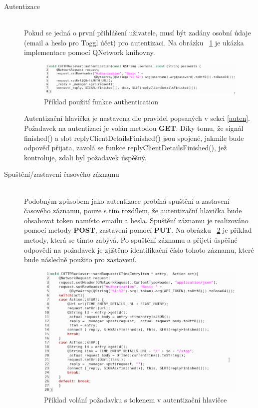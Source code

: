 \documentclass[thesis=B,czech]{FITthesis}[2012/06/26]
\begin{document}
\begin{description}
	\item[Autentizace]\hspace*{\fill} \\
	Pokud se jedná o první přihlášení uživatele, musí být zadány osobní údaje (email a heslo pro Toggl účet) pro autentizaci. Na obrázku ~\ref{fig:auth_code} je ukázka implementace pomocí QNetwork knihovny. 

 \begin{figure}[h]\centering
 	\includegraphics[width=1\textwidth]{auth_code.png}
 	\caption[Příklad použití finkci authentication]{Příklad použití funkce authentication}\label{fig:auth_code}
 \end{figure}
	 Autentizační hlavička je nastavena dle pravidel popsaných v sekci \ref{auten}. Požadavek na autentizaci je volán metodou \textbf{GET}. Díky tomu, že signál finished() a slot replyClientDetailsFinished() jsou spojené, jakmile bude odpověď přijata, zavolá se funkce replyClientDetailsFinished(), jež kontroluje, zdali byl požadavek úspěšný.
\item[Spuštění/zastavení časového záznamu ]\hspace*{\fill} \\
	Podobným způsobem jako autentizace probíhá spuštění a zastavení časového záznamu, pouze s tím rozdílem, že autentizační hlavička bude obsahovat token namísto emailu a hesla. Spuštění záznamu je realizováno pomocí metody \textbf{POST}, zastavení pomocí \textbf{PUT}. Na obrázku ~\ref{fig:start_stop_code} je příklad metody, která se tímto zabývá. Po spuštění záznamu a přijetí úspěšné odpovědi na požadavek je zjištěno identifikační číslo tohoto záznamu, které bude následně použito pro zastavení. 
	 \begin{figure}[h]\centering
		\includegraphics[width=1\textwidth]{start_stop_code.png}
		\caption[Příklad volání požadavku s tokenem v autentizační hlavičce]{Příklad volání požadavku s tokenem v autentizační hlavičce}\label{fig:start_stop_code}
	\end{figure}
\end{description}
\end{document}
